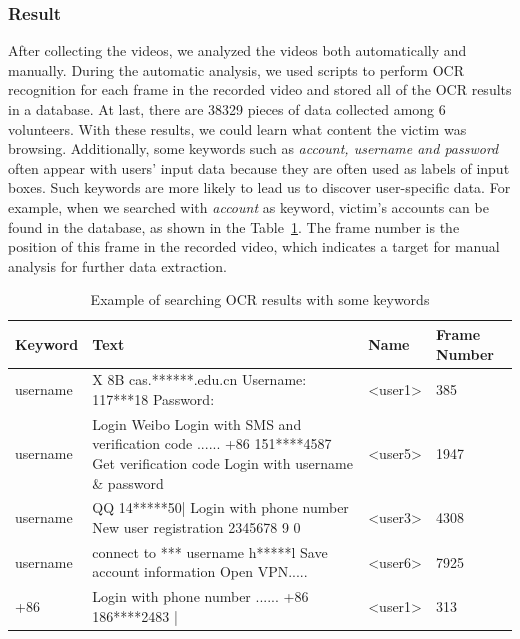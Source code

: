 \subsubsection{Result}

After collecting the videos, we analyzed the videos both automatically and manually.
During the automatic analysis, we used scripts to perform OCR recognition for each frame in the recorded video and stored all of the OCR results in a database.
At last, there are 38329 pieces of data collected among 6 volunteers.
With these results, we could learn what content the victim was browsing.
Additionally, some keywords such as \textit{account, username and password} often appear with users' input data because they are often used as labels of input boxes.
Such keywords are more likely to lead us to discover user-specific data.
For example, when we searched with \textit{account} as keyword, victim's accounts can be found in the database, as shown in the Table~\ref{tab:ocr_keyword_example}.
The frame number is the position of this frame in the recorded video, which indicates a target for manual analysis for further data extraction.

\begin{table}[t]
	\centering
	\begin{tabular}{|l|l|l|l|}
		\hline
		Keyword  & Text                                                                                                                          & Name                           & Frame Number \\ \hline
		username & X 8B cas.******.edu.cn Username: 117***18 Password:                                                                           & \textless{}user1\textgreater{} & 385          \\ \hline
		username & Login Weibo Login with SMS and verification code ...... +86 151****4587 Get verification code Login with username \& password & \textless{}user5\textgreater{} & 1947         \\ \hline
		username & QQ 14*****50| Login with phone number New user registration 2345678 9 0                                                       & \textless{}user3\textgreater{} & 4308         \\ \hline
		username & connect to *** username h*****l Save account information Open VPN.....                                                        & \textless{}user6\textgreater{} & 7925         \\ \hline
		+86      & Login with phone number ...... +86 186****2483 |                                                                              & \textless{}user1\textgreater{} & 313          \\ \hline
	\end{tabular}
	\caption{Example of searching OCR results with some keywords}
	\label{tab:ocr_keyword_example}
\end{table}


